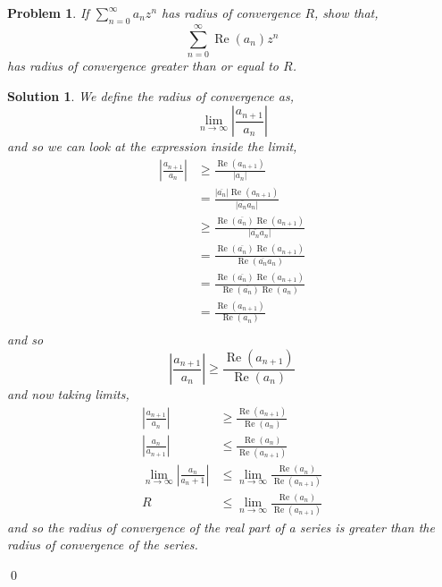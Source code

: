\documentclass{article}
\renewcommand{\Re}{\operatorname{Re}}
\newtheorem{problem}{Problem}
\newtheorem{solution}{Solution}
\begin{document}
\newpage
\begin{problem}
  If $\displaystyle{\sum_{n = 0}^\infty {a_nz^n}}$ has radius of convergence $R$, show that,
  $$ \sum_{n = 0}^\infty {\Re({a_n})z^n} $$
  has radius of convergence greater than or equal to $R$.
\end{problem}

\begin{solution}
  We define the radius of convergence as,
  $$ \lim_{n\to\infty} {\left | \frac{a_{n+1}}{a_n} \right |}$$
  and so we can look at the expression inside the limit,
  \begin{align*}
    \left | \frac{a_{n+1}}{a_n} \right | &\ge \frac{\Re(a_{n+1})}{|a_n|}\\
    &= \frac{|\overline{a_n}|\Re(a_{n+1})}{|\overline{a_n}a_n|}\\
    &\ge \frac{\Re(\overline{a_n})\Re(a_{n+1})}{|\overline{a_n}a_n|}\\
    &= \frac{\Re(\overline{a_n})\Re(a_{n+1})}{\Re(\overline{a_n}a_n)}\\
    &= \frac{\Re(\overline{a_n})\Re(a_{n+1})}{\Re(\overline{a_n})\Re(a_n)}\\
    &= \frac{\Re(a_{n+1})}{\Re(a_n)}\\
  \end{align*}
  and so
  $$ \left | \frac{a_{n+1}}{a_n} \right | \ge \frac{\Re(a_{n+1})}{\Re(a_n)} $$
  and now taking limits,
  \begin{align*}
    \left | \frac{a_{n+1}}{a_n} \right | &\ge \frac{\Re(a_{n+1})}{\Re(a_n)}\\
    \left | \frac{a_{n}}{a_{n+1}} \right | &\le \frac{\Re(a_{n})}{\Re(a_{n+1})}\\
    \lim_{n \to \infty} \left | \frac{a_{n}}{a_n+1} \right | &\le \lim_{n \to \infty} \frac{\Re(a_{n})}{\Re(a_{n+1})}\\
    R &\le \lim_{n \to \infty} \frac{\Re(a_{n})}{\Re(a_{n+1})}
  \end{align*}
  and so the radius of convergence of the real part of a series is greater than the radius of convergence of the series.
\end{solution}\qed
\end{document}
